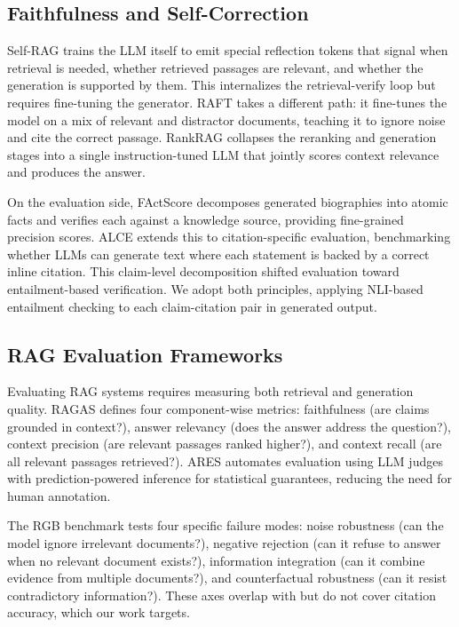 \documentclass[11pt]{article}
\begin{document}
\subsection{Faithfulness and Self-Correction}

Self-RAG \cite{asai2024selfrag} trains the LLM itself to emit special reflection tokens that signal when retrieval is needed, whether retrieved passages are relevant, and whether the generation is supported by them. This internalizes the retrieval-verify loop but requires fine-tuning the generator. RAFT \cite{zhang2024raft} takes a different path: it fine-tunes the model on a mix of relevant and distractor documents, teaching it to ignore noise and cite the correct passage. RankRAG \cite{yu2024rankrag} collapses the reranking and generation stages into a single instruction-tuned LLM that jointly scores context relevance and produces the answer.

On the evaluation side, FActScore \cite{min-etal-2023-factscore} decomposes generated biographies into atomic facts and verifies each against a knowledge source, providing fine-grained precision scores. ALCE \cite{gao2023enabling} extends this to citation-specific evaluation, benchmarking whether LLMs can generate text where each statement is backed by a correct inline citation. This claim-level decomposition shifted evaluation toward entailment-based verification. We adopt both principles, applying NLI-based entailment checking to each claim-citation pair in generated output.

\subsection{RAG Evaluation Frameworks}

Evaluating RAG systems requires measuring both retrieval and generation quality. RAGAS \cite{es2024ragas} defines four component-wise metrics: faithfulness (are claims grounded in context?), answer relevancy (does the answer address the question?), context precision (are relevant passages ranked higher?), and context recall (are all relevant passages retrieved?). ARES \cite{saadfalcon2024ares} automates evaluation using LLM judges with prediction-powered inference for statistical guarantees, reducing the need for human annotation.

The RGB benchmark \cite{chen2024benchmarking} tests four specific failure modes: noise robustness (can the model ignore irrelevant documents?), negative rejection (can it refuse to answer when no relevant document exists?), information integration (can it combine evidence from multiple documents?), and counterfactual robustness (can it resist contradictory information?). These axes overlap with but do not cover citation accuracy, which our work targets.
\end{document}
